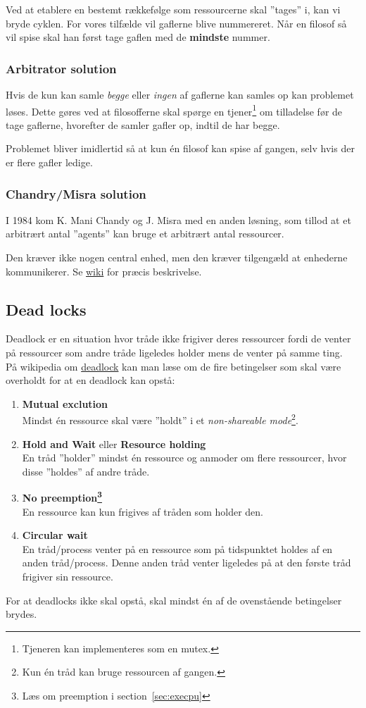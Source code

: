 Ved at etablere en bestemt rækkefølge som ressourcerne skal ''tages'' i, kan vi bryde cyklen. For vores tilfælde vil gaflerne blive nummereret. Når en filosof så vil spise skal han først tage gaflen med de \textbf{mindste} nummer.

\subsubsection{Arbitrator solution}
Hvis de kun kan samle \textit{begge} eller \textit{ingen} af gaflerne kan samles op kan problemet løses. Dette gøres ved at filosofferne skal spørge en tjener\footnote{Tjeneren kan implementeres som en mutex.} om tilladelse før de tage gaflerne, hvorefter de samler gafler op, indtil de har begge. 

Problemet bliver imidlertid så at kun én filosof kan spise af gangen, selv hvis der er flere gafler ledige.

\subsubsection{Chandry/Misra solution}
I 1984 kom K. Mani Chandy og J. Misra med en anden løsning, som tillod at et arbitrært antal ''agents'' kan bruge et arbitrært antal ressourcer.

Den kræver ikke nogen central enhed, men den kræver tilgengæld at enhederne kommunikerer. Se \href{https://en.wikipedia.org/wiki/Dining_philosophers_problem#Chandy.2FMisra_solution}{wiki} for præcis beskrivelse.

\subsection{Dead locks}\label{sec:deadlock}
Deadlock er en situation hvor tråde ikke frigiver deres ressourcer fordi de venter på ressourcer som andre tråde ligeledes holder mens de venter på samme ting.\\

På wikipedia om \href{https://en.wikipedia.org/wiki/Deadlock}{deadlock} kan man læse om de fire betingelser som skal være overholdt for at en deadlock kan opstå:
\begin{enumerate}
	\item \textbf{Mutual exclution}\\
	Mindst én ressource skal være ''holdt'' i et \textit{non-shareable mode}\footnote{Kun én tråd kan bruge ressourcen af gangen.}.
	\item \textbf{Hold and Wait} eller \textbf{Resource holding}\\
	En tråd ''holder'' mindst én ressource og anmoder om flere ressourcer, hvor disse ''holdes'' af andre tråde.
	\item \textbf{No preemption\footnote{Læs om preemption i section~\ref{sec:execpu}}}\\
	En ressource kan kun frigives af tråden som holder den.
	\item \textbf{Circular wait}\\
	En tråd/process venter på en ressource som på tidspunktet holdes af en anden tråd/process. Denne anden tråd venter ligeledes på at den første tråd frigiver sin ressource.
\end{enumerate}

For at deadlocks ikke skal opstå, skal mindst én af de ovenstående betingelser brydes.